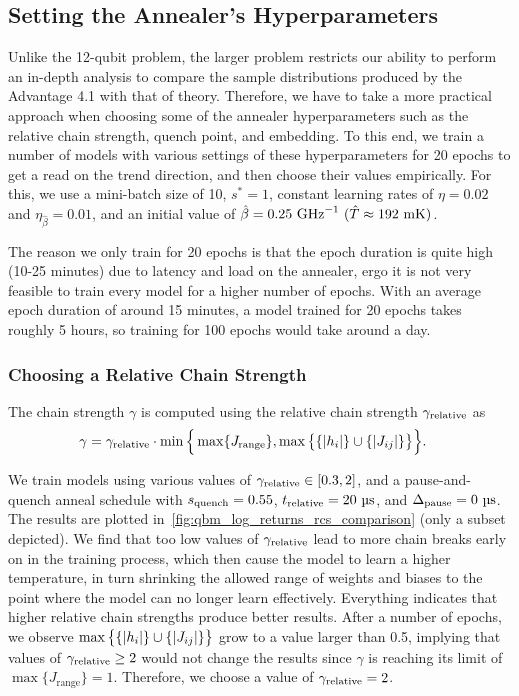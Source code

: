 \subsection{Setting the Annealer's Hyperparameters}\label{sec:qbm_hyperparameters}
Unlike the 12-qubit problem, the larger problem restricts our ability to perform an in-depth analysis to compare the sample distributions produced by the Advantage 4.1 with that of theory.
Therefore, we have to take a more practical approach when choosing some of the annealer hyperparameters such as the relative chain strength, quench point, and embedding.
To this end, we train a number of models with various settings of these hyperparameters for 20 epochs to get a read on the trend direction, and then choose their values empirically.
For this, we use a mini-batch size of 10, \( s^* = 1 \), constant learning rates of \( \eta = 0.02 \) and \( \eta_{\hat{\beta}} = 0.01 \), and an initial value of \( \betahat = 0.25 \ \si{\giga\hertz}^{-1} \ (\hat{T} \approx 192 \ \si{\milli\kelvin}) \).

The reason we only train for 20 epochs is that the epoch duration is quite high (10-25 minutes) due to latency and load on the annealer, ergo it is not very feasible to train every model for a higher number of epochs.
With an average epoch duration of around 15 minutes, a model trained for 20 epochs takes roughly 5 hours, so training for 100 epochs would take around a day.

\subsubsection{Choosing a Relative Chain Strength}\label{sec:qbm_rcs}
The chain strength \( \gamma \) is computed using the relative chain strength \( \gamma_{\text{relative}} \) as
\begin{align}
    \gamma
        &= \gamma_{\text{relative}} \cdot \min\Big\{
            \max\{J_\text{range}\}, \max\big\{\{\lvert h_i\rvert\} \cup \{\lvert J_{ij}\rvert\}\big\}
        \Big\}.
\end{align}

We train models using various values of \( \gamma_{\text{relative}} \in [0.3, 2] \), and a pause-and-quench anneal schedule with \( s_{\text{quench}} = 0.55 \), \( t_{\text{relative}} = 20 \ \si{\micro\second} \), and \( \Deltapause = 0 \ \si{\micro\second} \).
The results are plotted in~\cref{fig:qbm_log_returns_rcs_comparison} (only a subset depicted).
We find that too low values of \( \gamma_{\text{relative}} \) lead to more chain breaks early on in the training process, which then cause the model to learn a higher temperature, in turn shrinking the allowed range of weights and biases to the point where the model can no longer learn effectively.
Everything indicates that higher relative chain strengths produce better results.
After a number of epochs, we observe \( \max\big\{ \{\lvert h_i\rvert\} \cup \{\lvert J_{ij}\rvert\} \big\} \) grow to a value larger than 0.5, implying that values of \( \gamma_{\text{relative}} \ge 2 \) would not change the results since \( \gamma \) is reaching its limit of \( \max\{J_\text{range}\} = 1 \).
Therefore, we choose a value of \( \gamma_{\text{relative}} = 2 \).

